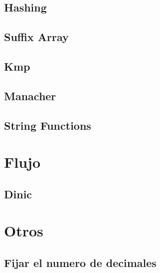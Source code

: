 \documentclass[a4paper,11pt,landscape,twocolumn]{article}
\begin{document}
\subsection{Hashing}



\subsection{Suffix Array}



\subsection{Kmp}



\subsection{Manacher}



\subsection{String Functions}



\section{Flujo}

\subsection{Dinic}



\section{Otros}

\subsection{Fijar el numero de decimales}


\end{document}
